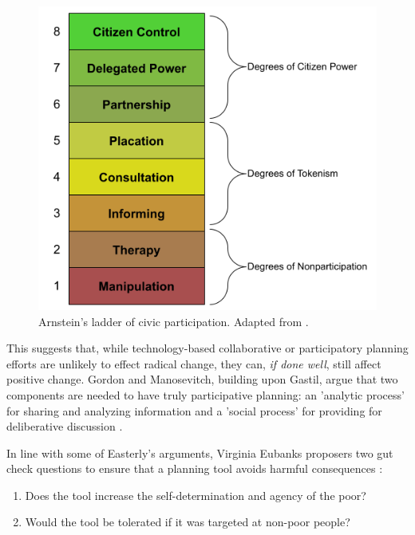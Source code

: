 \begin{figure}[h]
	\centering
	\includegraphics[scale=0.5]{Figures/chap2/civic_ladder.png}
	\caption[Arnstein's ladder of civic participation]{Arnstein's ladder of civic participation. Adapted from \cite{arnsteinLadderCitizenParticipation1969}.}
	\label{fig:civic_ladder}
\end{figure}

This suggests that, while technology-based collaborative or participatory planning efforts are unlikely to effect radical change, they can, \textit{if done well}, still affect positive change. Gordon and Manosevitch, building upon Gastil, argue that two components are needed to have truly participative planning: an 'analytic process' for sharing and analyzing information and a 'social process' for providing for deliberative discussion \cite{gordonAugmentedDeliberationMerging2011}. 

In line with some of Easterly's arguments, Virginia Eubanks proposers two gut check questions to ensure that a planning tool avoids harmful consequences \cite{eubanksAutomatingInequalityHow2018}:

\begin{enumerate} \setlength{\itemsep}{0pt} \setlength{\parskip}{0pt} 
	\item{Does the tool increase the self-determination and agency of the poor?}
	\item{Would the tool be tolerated if it was targeted at non-poor people?}
\end{enumerate}


